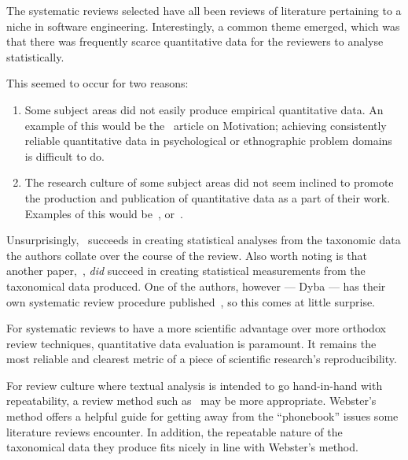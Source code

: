 
The systematic reviews selected have all been reviews of literature pertaining to a niche in software engineering. Interestingly, a common theme emerged, which was that there was frequently scarce quantitative data for the reviewers to analyse statistically.\par

This seemed to occur for two reasons:
\begin{enumerate}
    \item Some subject areas did not easily produce empirical quantitative data. An example of this would be the~\cite{Benavides} article on Motivation; achieving consistently reliable quantitative data in psychological or ethnographic problem domains is difficult to do.
    \item The research culture of some subject areas did not seem inclined to promote the production and publication of quantitative data as a part of their work. Examples of this would be~\cite{Chen2007}, or~\cite{Smite2010}. 
\end{enumerate}

Unsurprisingly,~\cite{Kitchenham2013} succeeds in creating statistical analyses from the taxonomic data the authors collate over the course of the review. Also worth noting is that another paper,~\cite{Kampanes2007}, \emph{did} succeed in creating statistical measurements from the taxonomical data produced. One of the authors, however --- Dyba --- has their own systematic review procedure published~\citep{dybaguidelines}, so this comes at little surprise.\par

For systematic reviews to have a more scientific advantage over more orthodox review techniques, quantitative data evaluation is paramount. It remains the most reliable and clearest metric of a piece of scientific research's reproducibility.\par

For review culture where textual analysis is intended to go hand-in-hand with repeatability, a review method such as~\cite{Webster2002} may be more appropriate. Webster's method offers a helpful guide for getting away from the ``phonebook'' issues some literature reviews encounter. In addition, the repeatable nature of the taxonomical data they produce fits nicely in line with Webster's method.\par

